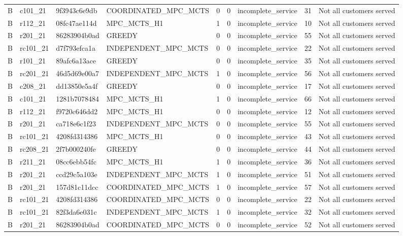 \begin{table}
{\begin{tabular}{llllrrlrl}
B & c101\_21 & 9f3943c6e9db & COORDINATED\_MPC\_MCTS & 0 & 0 & incomplete\_service & 31 & Not all customers served \\
B & r112\_21 & 08fc47ae114d & MPC\_MCTS\_H1 & 1 & 0 & incomplete\_service & 10 & Not all customers served \\
B & r201\_21 & 86283904b0ad & GREEDY & 0 & 0 & incomplete\_service & 55 & Not all customers served \\
B & rc101\_21 & d7f793efca1a & INDEPENDENT\_MPC\_MCTS & 0 & 0 & incomplete\_service & 22 & Not all customers served \\
B & r101\_21 & 89afc6a13ace & GREEDY & 0 & 0 & incomplete\_service & 35 & Not all customers served \\
B & rc201\_21 & 46d5d69e00a7 & INDEPENDENT\_MPC\_MCTS & 1 & 0 & incomplete\_service & 56 & Not all customers served \\
B & c208\_21 & dd13850e5a4f & GREEDY & 0 & 0 & incomplete\_service & 17 & Not all customers served \\
B & c101\_21 & 1281b7078484 & MPC\_MCTS\_H1 & 1 & 0 & incomplete\_service & 66 & Not all customers served \\
B & r112\_21 & f9720c646dd2 & MPC\_MCTS\_H1 & 0 & 0 & incomplete\_service & 12 & Not all customers served \\
B & r201\_21 & ca718e6c1f23 & INDEPENDENT\_MPC\_MCTS & 0 & 0 & incomplete\_service & 55 & Not all customers served \\
B & rc101\_21 & 4208fd314386 & MPC\_MCTS\_H1 & 0 & 0 & incomplete\_service & 43 & Not all customers served \\
B & rc208\_21 & 2f7b000240fe & GREEDY & 0 & 0 & incomplete\_service & 44 & Not all customers served \\
B & r211\_21 & 08cc6ebb54fc & MPC\_MCTS\_H1 & 1 & 0 & incomplete\_service & 36 & Not all customers served \\
B & r201\_21 & ccd29c5a103e & INDEPENDENT\_MPC\_MCTS & 1 & 0 & incomplete\_service & 51 & Not all customers served \\
B & r201\_21 & 157d81c11dcc & COORDINATED\_MPC\_MCTS & 1 & 0 & incomplete\_service & 57 & Not all customers served \\
B & rc101\_21 & 4208fd314386 & COORDINATED\_MPC\_MCTS & 0 & 0 & incomplete\_service & 22 & Not all customers served \\
B & rc101\_21 & 82f3da6e031c & INDEPENDENT\_MPC\_MCTS & 1 & 0 & incomplete\_service & 32 & Not all customers served \\
B & r201\_21 & 86283904b0ad & COORDINATED\_MPC\_MCTS & 0 & 0 & incomplete\_service & 52 & Not all customers served \\

\end{tabular}}
\end{table}

